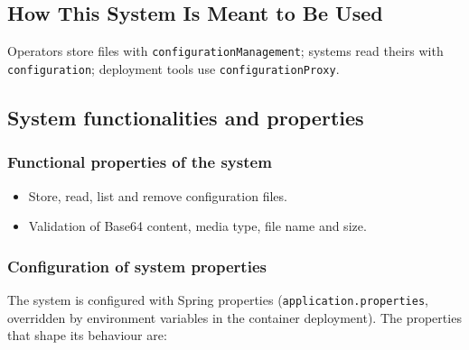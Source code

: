 \documentclass[a4paper]{arrowhead}
\begin{document}
\subsection{How This System Is Meant to Be Used}
\label{sec:use}

Operators store files with \texttt{configuration\allowbreak{}Management}; systems read theirs with \texttt{configuration}; deployment tools use \texttt{configurationProxy}.

\subsection{System functionalities and properties}
\label{sec:properties}

\subsubsection{Functional properties of the system}

\begin{itemize}
  \item Store, read, list and remove configuration files.
  \item Validation of Base64 content, media type, file name and size.
\end{itemize}

\subsubsection{Configuration of system properties}

The system is configured with Spring properties (\texttt{application.properties}, overridden by environment variables in the container deployment). The properties that shape its behaviour are:
\end{document}
